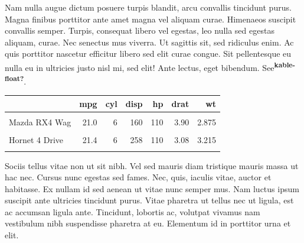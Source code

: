 \documentclass[
  9pt,
  letterpaper,
  DIV=11,
  numbers=noendperiod]{scrartcl}
\begin{document}
Nam nulla augue dictum posuere turpis blandit, arcu convallis tincidunt
purus. Magna finibus porttitor ante amet magna vel aliquam curae.
Himenaeos suscipit convallis semper. Turpis, consequat libero vel
egestas, leo nulla sed egestas aliquam, curae. Nec senectus mus viverra.
Ut sagittis sit, sed ridiculus enim. Ac quis porttitor nascetur
efficitur libero sed elit curae congue. Sit pellentesque eu nulla eu in
ultricies justo nisl mi, sed elit! Ante lectus, eget bibendum.
See\textsuperscript{\textbf{kable-float?}}.

\begin{table}\begingroup\fontsize{7}{9}\selectfont

\begin{tabular}[t]{lrrrrrr}
\toprule
  & mpg & cyl & disp & hp & drat & wt\\
\midrule
\cellcolor{gray!6}{Mazda RX4} & \cellcolor{gray!6}{21.0} & \cellcolor{gray!6}{6} & \cellcolor{gray!6}{160} & \cellcolor{gray!6}{110} & \cellcolor{gray!6}{3.90} & \cellcolor{gray!6}{2.620}\\
Mazda RX4 Wag & 21.0 & 6 & 160 & 110 & 3.90 & 2.875\\
\cellcolor{gray!6}{Datsun 710} & \cellcolor{gray!6}{22.8} & \cellcolor{gray!6}{4} & \cellcolor{gray!6}{108} & \cellcolor{gray!6}{93} & \cellcolor{gray!6}{3.85} & \cellcolor{gray!6}{2.320}\\
Hornet 4 Drive & 21.4 & 6 & 258 & 110 & 3.08 & 3.215\\
\cellcolor{gray!6}{Hornet Sportabout} & \cellcolor{gray!6}{18.7} & \cellcolor{gray!6}{8} & \cellcolor{gray!6}{360} & \cellcolor{gray!6}{175} & \cellcolor{gray!6}{3.15} & \cellcolor{gray!6}{3.440}\\
\bottomrule
\end{tabular}
\endgroup{}\end{table}

Sociis tellus vitae non ut sit nibh. Vel sed mauris diam tristique
mauris massa ut hac nec. Cursus nunc egestas sed fames. Nec, quis,
iaculis vitae, auctor et habitasse. Ex nullam id sed aenean ut vitae
nunc semper mus. Nam luctus ipsum suscipit ante ultricies tincidunt
purus. Vitae pharetra ut tellus nec ut ligula, est ac accumsan ligula
ante. Tincidunt, lobortis ac, volutpat vivamus nam vestibulum nibh
suspendisse pharetra at eu. Elementum id in porttitor urna et elit.
\end{document}
